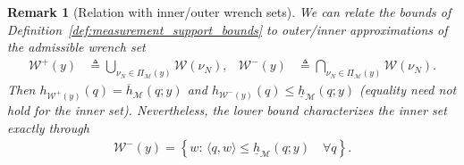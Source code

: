 \documentclass[11pt,a4paper]{article}
\theoremstyle{proposition}
\newtheorem{remark}[theorem]{Remark}
\begin{document}
\begin{remark}[Relation with inner/outer wrench sets]
    We can relate the bounds of Definition~\ref{def:measurement_support_bounds} to outer/inner approximations of the admissible wrench set
    \begin{align}
        \mathcal W^+(y)
        &\triangleq
        \bigcup_{\nu_N\in\Pi_{\mathcal M}(y)}\mathcal W(\nu_N),
        &
        \mathcal W^-(y)
        &\triangleq
        \bigcap_{\nu_N\in\Pi_{\mathcal M}(y)}\mathcal W(\nu_N).
        \end{align}
    Then $h_{\mathcal W^+(y)}(q) =\overline h_{\mathcal M}(q;y)$ and $h_{\mathcal W^-(y)}(q) \le\underline h_{\mathcal M}(q;y)$ (equality need not hold for the inner set). Nevertheless, the lower bound characterizes the inner set exactly through
    \begin{align}
        \mathcal W^-(y)
        =
        \left\{
        w:\,
        \langle q,w\rangle
        \le
        \underline h_{\mathcal M}(q;y)
        \quad \forall q
        \right\}.
    \end{align}
\end{remark}
\end{document}
